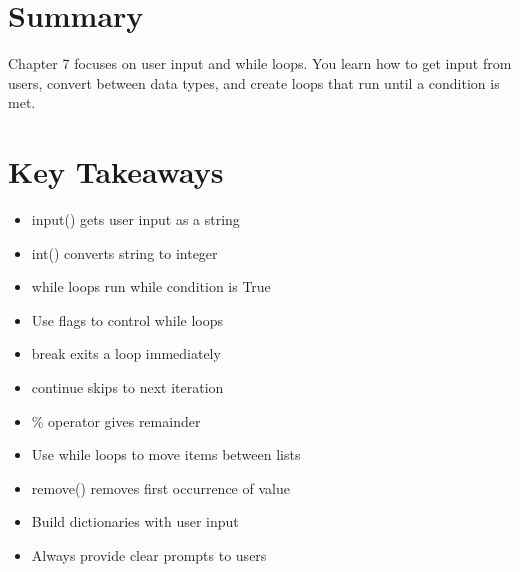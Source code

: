 \section*{Summary}
Chapter 7 focuses on user input and while loops. You learn how to get input from users, convert between data types, and create loops that run until a condition is met.

\section*{Key Takeaways}
\begin{itemize}
    \item input() gets user input as a string
    \item int() converts string to integer
    \item while loops run while condition is True
    \item Use flags to control while loops
    \item break exits a loop immediately
    \item continue skips to next iteration
    \item \% operator gives remainder
    \item Use while loops to move items between lists
    \item remove() removes first occurrence of value
    \item Build dictionaries with user input
    \item Always provide clear prompts to users
\end{itemize} 